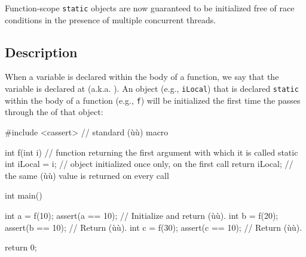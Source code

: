 


\setcounter{table}{0}
\setcounter{footnote}{0}
\setcounter{lstlisting}{0}



Function-scope \lstinline!static! objects are now guaranteed to be
initialized free of race conditions in the presence
of multiple concurrent threads.

\subsection[Description]{Description}\label{description-functionstatic}

When a variable is declared within the body of a function, we say that
the variable is declared at  (a.k.a.
). An object (e.g., \lstinline!iLocal!) that is
declared \lstinline!static! within the body of a function (e.g.,
\lstinline!f!) will be initialized the first time the  passes through the  of that object:

\begin{emcppslisting}
#include <cassert>  // standard (ù{}ù) macro

int f(int i) // function returning the first argument with which it is called
{
    static int iLocal = i;  // object initialized once only, on the first call
    return iLocal;          // the same (ù{}ù) value is returned on every call
}

int main()
{
    int a = f(10);  assert(a == 10);  // Initialize and return (ù{}ù).
    int b = f(20);  assert(b == 10);  // Return (ù{}ù).
    int c = f(30);  assert(c == 10);  // Return (ù{}ù).

    return 0;
}
\end{emcppslisting}


